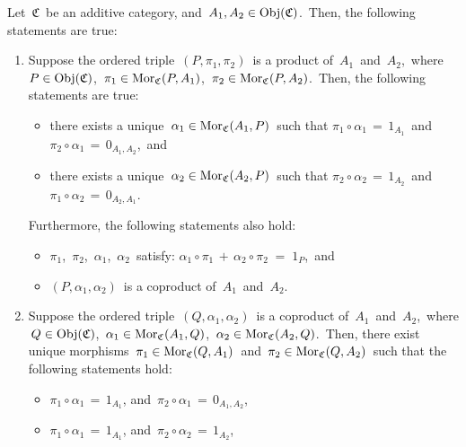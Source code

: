 \vskip 0.5cm
\begin{proposition}
\label{InAdditiveCategoryProductsCoproductsAreSame}
\mbox{}
\vskip 0.10cm
\noindent
Let \,$\mathfrak{C}$\, be an additive category, and \,$A_{1}, A_{2} \in \textnormal{Obj}(\mathfrak{C})$.\,
Then, the following statements are true:
\begin{enumerate}
\item
	Suppose the ordered triple \,$(P,\pi_{1},\pi_{2})$\, is a product of \,$A_{1}$\, and \,$A_{2}$,\,
	where \,$P \in \textnormal{Obj}(\mathfrak{C})$, \,$\pi_{1} \in \textnormal{Mor}_{\mathfrak{C}}(P,A_{1})$, \,$\pi_{2} \in \textnormal{Mor}_{\mathfrak{C}}(P,A_{2})$.\,
	Then, the following statements are true:
	\begin{itemize}
	\item
		there exists a unique
		\,$\alpha_{1} \in \textnormal{Mor}_{\mathfrak{C}}(A_{1},P)$\,
		such that
		\;$\pi_{1} \circ \alpha_{1} \,=\, 1_{A_{1}}$\, and \;$\pi_{2} \circ \alpha_{1} \,=\, 0_{A_{1},A_{2}}$,\, and
	\item
		there exists a unique
		\,$\alpha_{2} \in \textnormal{Mor}_{\mathfrak{C}}(A_{2},P)$\,
		such that
		\;$\pi_{2} \circ \alpha_{2} \,=\, 1_{A_{2}}$\, and \;$\pi_{1} \circ \alpha_{2} \,=\, 0_{A_{2},A_{1}}$.\,
	\end{itemize}
	Furthermore, the following statements also hold:
	\begin{itemize}
	\item
		$\pi_{1}$, \,$\pi_{2}$, \,$\alpha_{1}$, \,$\alpha_{2}$\, satisfy:
		\;$\alpha_{1} \circ \pi_{1} \,+\, \alpha_{2} \circ \pi_{2} \; = \; 1_{P}$,\, and
	\item
		$(P,\alpha_{1},\alpha_{2})$\, is a coproduct of \,$A_{1}$\, and \,$A_{2}$.\,
	\end{itemize}
\item
	Suppose the ordered triple \,$(Q,\alpha_{1},\alpha_{2})$\, is a coproduct of \,$A_{1}$\, and \,$A_{2}$,\,
	where
	\,$Q \in \textnormal{Obj}(\mathfrak{C})$,
	\,$\alpha_{1} \in \textnormal{Mor}_{\mathfrak{C}}(A_{1},Q)$,
	\,$\alpha_{2} \in \textnormal{Mor}_{\mathfrak{C}}(A_{2},Q)$.\,
	Then, there {\color{red}exist unique} morphisms
	\,$\pi_{1} \in \textnormal{Mor}_{\mathfrak{C}}(Q,A_{1})$\, and \,$\pi_{2} \in \textnormal{Mor}_{\mathfrak{C}}(Q,A_{2})$\,
	such that the following statements hold:
	\begin{itemize}
	\item
		$\pi_{1} \circ \alpha_{1} \,=\, 1_{A_{1}}$,\; and \,\;$\pi_{2} \circ \alpha_{1} \,=\, 0_{A_{1},A_{2}}$,\,
	\item
		$\pi_{1} \circ \alpha_{1} \,=\, 1_{A_{1}}$,\; and \,\;$\pi_{2} \circ \alpha_{2} \,=\, 1_{A_{2}}$,\,

\end{itemize}
\end{enumerate}
\end{proposition}
